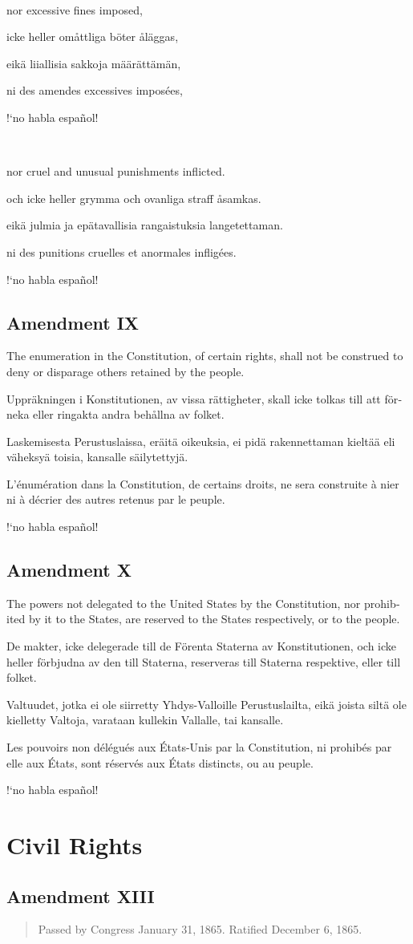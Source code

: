 \documentclass[a4paper,landscape,10pt]{article}
\newcommand{\tblock}[5]{\noindent\begin{minipage}[t]{0.18\textwidth}\foreignlanguage{english}{#1}\end{minipage}\hskip 0.025\textwidth\begin{minipage}[t]{0.18\textwidth}\foreignlanguage{swedish}{#2}\end{minipage}\hskip 0.025\textwidth\begin{minipage}[t]{0.18\textwidth}\foreignlanguage{finnish}{#3}\end{minipage}\hskip 0.025\textwidth\begin{minipage}[t]{0.18\textwidth}\foreignlanguage{french}{#4}\end{minipage}\hskip 0.025\textwidth\begin{minipage}[t]{0.18\textwidth}\foreignlanguage{spanish}{#5}\end{minipage}}
\begin{document}
~

\tblock
{nor excessive fines imposed,}
{icke heller omåttliga böter åläggas,}
{eikä liiallisia sakkoja määrättämän,}
{ni des amendes excessives imposées,}
{!`no habla español!}

~

\tblock
{nor cruel and unusual punishments inflicted.}
{och icke heller grymma och ovanliga straff åsamkas.}
{eikä julmia ja epätavallisia rangaistuksia langetettaman.}
{ni des punitions cruelles et anormales infligées.}
{!`no habla español!}

\subsection*{Amendment IX}
\tblock
{The enumeration in the Constitution, of certain rights, shall not be construed to deny or disparage others retained by the people.}
{Uppräkningen i Konstitutionen, av vissa rättigheter, skall icke tolkas till att förneka eller ringakta andra behållna av folket.}
{Laskemisesta Perustuslaissa, eräitä oikeuksia, ei pidä rakennettaman kieltää eli väheksyä toisia, kansalle säilytettyjä.}
{L'énumération dans la Constitution, de certains droits, ne sera construite à nier ni à décrier des autres retenus par le peuple.}
{!`no habla español!}

\subsection*{Amendment X}
\tblock
{The powers not delegated to the United States by the Constitution, nor prohibited by it to the States, are reserved to the States respectively, or to the people.}
{De makter, icke delegerade till de Förenta Staterna av Konstitutionen, och icke heller förbjudna av den till Staterna, reserveras till Staterna respektive, eller till folket.}
{Valtuudet, jotka ei ole siirretty Yhdys-Valloille Perustuslailta, eikä joista siltä ole kielletty Valtoja, varataan kullekin Vallalle, tai kansalle.}
{Les pouvoirs non délégués aux États-Unis par la Constitution, ni prohibés par elle aux États, sont réservés aux États distincts, ou au peuple.}
{!`no habla español!}


\section*{Civil Rights}
\subsection*{Amendment XIII}
\begin{quote}\small
	Passed by Congress January 31, 1865. Ratified December 6, 1865.
\end{quote}
\end{document}

